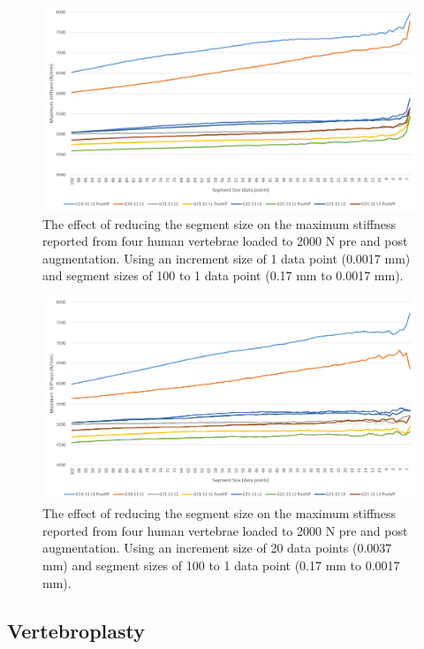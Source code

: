 \begin{figure}[ht!]
\centering
\includegraphics[width=6in]{Chapters/Chapter_HT_images/findStiffness_1incr.png}
\caption{The effect of reducing the segment size on the maximum stiffness reported from four human vertebrae loaded to 2000 N pre and post augmentation. Using an increment size of 1 data point (0.0017 mm) and segment sizes of 100 to 1 data point (0.17 mm to 0.0017 mm).}
\label{fig:exp_flowchart}
\end{figure}

\begin{figure}[ht!]
\centering
\includegraphics[width=6in]{Chapters/Chapter_HT_images/findStiffness_20incr.png}
\caption{The effect of reducing the segment size on the maximum stiffness reported from four human vertebrae loaded to 2000 N pre and post augmentation. Using an increment size of 20 data points (0.0037 mm) and segment sizes of 100 to 1 data point (0.17 mm to 0.0017 mm).}
\label{fig:exp_flowchart}
\end{figure}

\subsection{Vertebroplasty}

